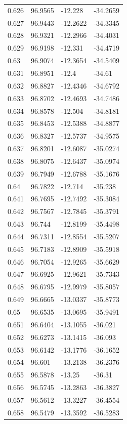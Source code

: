 \begin{tabular}{llll}
0.626 & 96.9565 & -12.228 & -34.2659 \\
0.627 & 96.9443 & -12.2622 & -34.3345 \\
0.628 & 96.9321 & -12.2966 & -34.4031 \\
0.629 & 96.9198 & -12.331 & -34.4719 \\
0.63 & 96.9074 & -12.3654 & -34.5409 \\
0.631 & 96.8951 & -12.4 & -34.61 \\
0.632 & 96.8827 & -12.4346 & -34.6792 \\
0.633 & 96.8702 & -12.4693 & -34.7486 \\
0.634 & 96.8578 & -12.504 & -34.8181 \\
0.635 & 96.8453 & -12.5388 & -34.8877 \\
0.636 & 96.8327 & -12.5737 & -34.9575 \\
0.637 & 96.8201 & -12.6087 & -35.0274 \\
0.638 & 96.8075 & -12.6437 & -35.0974 \\
0.639 & 96.7949 & -12.6788 & -35.1676 \\
0.64 & 96.7822 & -12.714 & -35.238 \\
0.641 & 96.7695 & -12.7492 & -35.3084 \\
0.642 & 96.7567 & -12.7845 & -35.3791 \\
0.643 & 96.744 & -12.8199 & -35.4498 \\
0.644 & 96.7311 & -12.8554 & -35.5207 \\
0.645 & 96.7183 & -12.8909 & -35.5918 \\
0.646 & 96.7054 & -12.9265 & -35.6629 \\
0.647 & 96.6925 & -12.9621 & -35.7343 \\
0.648 & 96.6795 & -12.9979 & -35.8057 \\
0.649 & 96.6665 & -13.0337 & -35.8773 \\
0.65 & 96.6535 & -13.0695 & -35.9491 \\
0.651 & 96.6404 & -13.1055 & -36.021 \\
0.652 & 96.6273 & -13.1415 & -36.093 \\
0.653 & 96.6142 & -13.1776 & -36.1652 \\
0.654 & 96.601 & -13.2138 & -36.2376 \\
0.655 & 96.5878 & -13.25 & -36.31 \\
0.656 & 96.5745 & -13.2863 & -36.3827 \\
0.657 & 96.5612 & -13.3227 & -36.4554 \\
0.658 & 96.5479 & -13.3592 & -36.5283 \\

\end{tabular}
